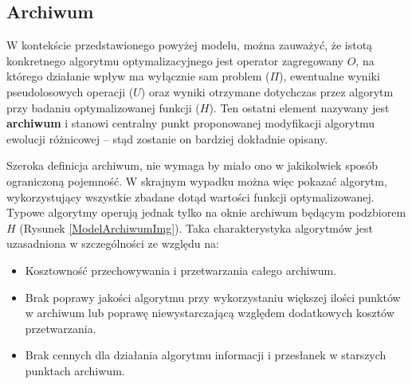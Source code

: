 \documentclass[12pt,a4paper]{report}
\begin{document}
{\subsection{Archiwum}
\par{
W kontekście przedstawionego powyżej modelu, można zauważyć, że istotą konkretnego algorytmu optymalizacyjnego jest operator zagregowany $O$, na którego działanie wpływ ma wyłącznie sam problem ($\Pi$), ewentualne wyniki pseudolosowych operacji ($U$) oraz wyniki otrzymane dotychczas przez algorytm przy badaniu optymalizowanej funkcji ($H$). Ten ostatni element nazywany jest \textbf{archiwum} i stanowi centralny punkt proponowanej modyfikacji algorytmu ewolucji różnicowej -- stąd zostanie on bardziej dokładnie opisany.
}
\par{
Szeroka definicja archiwum, nie wymaga by miało ono w jakikolwiek sposób ograniczoną pojemność. W skrajnym wypadku można więc pokazać algorytm, wykorzystujący wszystkie zbadane dotąd wartości funkcji optymalizowanej. Typowe algorytmy operują jednak tylko na oknie archiwum będącym podzbiorem $H$ (Rysunek \ref{ModelArchiwumImg}). Taka charakterystyka algorytmów jest uzasadniona w szczególności ze względu na:
\par{
	\begin{itemize}
		\item Kosztowność przechowywania i przetwarzania całego archiwum.
		\item Brak poprawy jakości algorytmu przy wykorzystaniu większej ilości punktów w archiwum lub poprawę niewystarczającą względem dodatkowych kosztów przetwarzania.
		\item Brak cennych dla działania algorytmu informacji i przesłanek w starszych punktach archiwum.
\end{itemize}
}

}}
\end{document}

